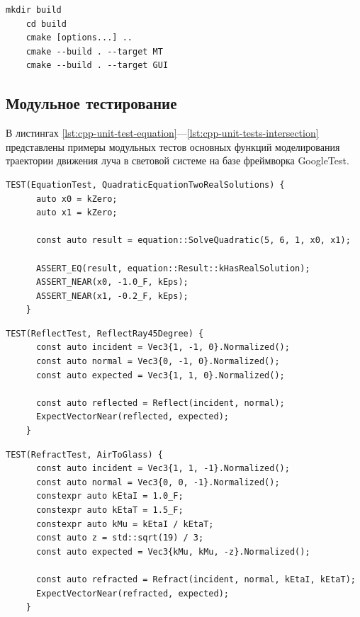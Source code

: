 
\begin{lstlisting}[gobble=8, caption={Сборка\label{lst:cmake}}]
	mkdir build
	cd build
	cmake [options...] ..
	cmake --build . --target MT
	cmake --build . --target GUI
\end{lstlisting}

\begin{FixLineStretch}
\section{Модульное тестирование}
\end{FixLineStretch}

В листингах \ref{lst:cpp-unit-test-equation}—\ref{lst:cpp-unit-tests-intersection} представлены примеры модульных тестов основных функций моделирования траектории движения луча в световой системе на базе фреймворка GoogleTest.

\begin{lstlisting}[gobble=8, caption={Юнит-тест функции решения квадратных уравнений\label{lst:cpp-unit-test-equation}}]
	TEST(EquationTest, QuadraticEquationTwoRealSolutions) {
	  auto x0 = kZero;
	  auto x1 = kZero;

	  const auto result = equation::SolveQuadratic(5, 6, 1, x0, x1);

	  ASSERT_EQ(result, equation::Result::kHasRealSolution);
	  ASSERT_NEAR(x0, -1.0_F, kEps);
	  ASSERT_NEAR(x1, -0.2_F, kEps);
	}
\end{lstlisting}

\begin{lstlisting}[gobble=8, caption={Юнит-тест функции отражения\label{lst:cpp-unit-test-reflection}}]
	TEST(ReflectTest, ReflectRay45Degree) {
	  const auto incident = Vec3{1, -1, 0}.Normalized();
	  const auto normal = Vec3{0, -1, 0}.Normalized();
	  const auto expected = Vec3{1, 1, 0}.Normalized();

	  const auto reflected = Reflect(incident, normal);
	  ExpectVectorNear(reflected, expected);
	}
\end{lstlisting}

\pagebreak

\begin{lstlisting}[gobble=8, caption={Юнит-тест функции преломления\label{lst:cpp-unit-test-refraction}}]
	TEST(RefractTest, AirToGlass) {
	  const auto incident = Vec3{1, 1, -1}.Normalized();
	  const auto normal = Vec3{0, 0, -1}.Normalized();
	  constexpr auto kEtaI = 1.0_F;
	  constexpr auto kEtaT = 1.5_F;
	  constexpr auto kMu = kEtaI / kEtaT;
	  const auto z = std::sqrt(19) / 3;
	  const auto expected = Vec3{kMu, kMu, -z}.Normalized();

	  const auto refracted = Refract(incident, normal, kEtaI, kEtaT);
	  ExpectVectorNear(refracted, expected);
	}
\end{lstlisting}

